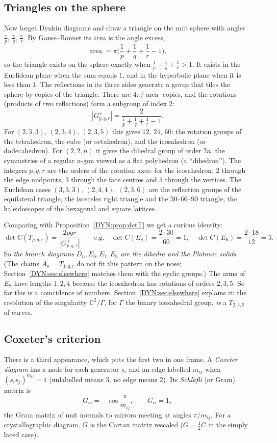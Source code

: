 \documentclass[11pt,openany]{book}
\theoremstyle{plain}
\theoremstyle{definition}
\theoremstyle{remark}
\newcommand{\C}{\mathbb{C}}
\newcommand{\abs}[1]{\left\lvert #1 \right\rvert}
\begin{document}
\subsection*{Triangles on the sphere}
Now forget Dynkin diagrams and draw a triangle on the unit sphere with angles $\frac\pi p$, $\frac\pi q$,
$\frac\pi r$. By Gauss--Bonnet its area is the angle excess,
\[
  \operatorname{area}=\pi\Big(\frac1p+\frac1q+\frac1r-1\Big),
\]
so the triangle exists on the sphere exactly when $\frac1p+\frac1q+\frac1r>1$. It exists in the
Euclidean plane when the sum equals $1$, and in the hyperbolic plane when it is less than $1$. The
reflections in its three sides generate a group that tiles the sphere by copies of the triangle. There
are $4\pi/\operatorname{area}$ copies, and the rotations (products of two reflections) form a subgroup
of index $2$:
\[
  \abs{G^+_{p,q,r}}=\frac{2}{\frac1p+\frac1q+\frac1r-1}.
\]
For $(2,3,3)$, $(2,3,4)$, $(2,3,5)$ this gives $12$, $24$, $60$: the rotation groups of the tetrahedron,
the cube (or octahedron), and the icosahedron (or dodecahedron). For $(2,2,n)$ it gives the dihedral
group of order $2n$, the symmetries of a regular $n$-gon viewed as a flat polyhedron (a ``dihedron'').
The integers $p,q,r$ are the orders of the rotation axes: for the icosahedron, $2$ through the edge
midpoints, $3$ through the face centres and $5$ through the vertices. The Euclidean cases $(3,3,3)$,
$(2,4,4)$, $(2,3,6)$ are the reflection groups of the equilateral triangle, the isosceles right
triangle and the $30$--$60$--$90$ triangle, the kaleidoscopes of the hexagonal and square lattices.

Comparing with Proposition~\ref{DYN:prop:detT} we get a curious identity:
\[
  \det C(T_{p,q,r})=\frac{2pqr}{\abs{G^+_{p,q,r}}}\qquad\text{e.g.}\quad
  \det C(E_8)=\frac{2\cdot30}{60}=1,\quad \det C(E_6)=\frac{2\cdot18}{12}=3.
\]
So \emph{the branch diagrams $D_n,E_6,E_7,E_8$ are the dihedra and the Platonic solids}. (The chains
$A_n=T_{1,q,r}$ do not fit this pattern on the nose; Section~\ref{DYN:sec:elsewhere} matches them with
the cyclic groups.) The arms of $E_8$ have lengths $1,2,4$ because the icosahedron
has rotations of orders $2,3,5$. So far this is a coincidence of numbers. Section~\ref{DYN:sec:elsewhere}
explains it: the resolution of the singularity $\C^2/\Gamma$, for $\Gamma$ the binary icosahedral group,
\emph{is} a $T_{2,3,5}$ of curves.

\subsection*{Coxeter's criterion}
There is a third appearance, which puts the first two in one frame. A \emph{Coxeter diagram} has a node for each
generator $s_i$ and an edge labelled $m_{ij}$ when $(s_is_j)^{m_{ij}}=1$ (unlabelled means $3$, no edge
means $2$). Its \emph{Schl\"afli} (or Gram) matrix is
\[
  G_{ij}=-\cos\frac{\pi}{m_{ij}},\qquad G_{ii}=1,
\]
the Gram matrix of unit normals to mirrors meeting at angles $\pi/m_{ij}$. For a crystallographic
diagram, $G$ is the Cartan matrix rescaled ($G=\frac12C$ in the simply laced case).
\end{document}
